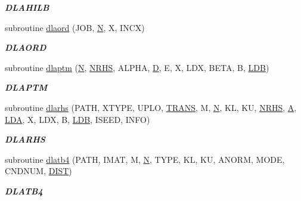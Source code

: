 \begin{DoxyCompactItemize}
\begin{DoxyCompactList}\small\item\em {\bfseries D\+L\+A\+H\+I\+L\+B} \end{DoxyCompactList}\item 
subroutine \hyperlink{group__double__lin_ga7352d554002db1120a207ed2ee03a787}{dlaord} (J\+O\+B, \hyperlink{polmisc_8c_a0240ac851181b84ac374872dc5434ee4}{N}, X, I\+N\+C\+X)
\begin{DoxyCompactList}\small\item\em {\bfseries D\+L\+A\+O\+R\+D} \end{DoxyCompactList}\item 
subroutine \hyperlink{group__double__lin_ga2531f677f628d30acf84634929d904e5}{dlaptm} (\hyperlink{polmisc_8c_a0240ac851181b84ac374872dc5434ee4}{N}, \hyperlink{example__user_8c_aa0138da002ce2a90360df2f521eb3198}{N\+R\+H\+S}, A\+L\+P\+H\+A, \hyperlink{odrpack_8h_a7dae6ea403d00f3687f24a874e67d139}{D}, E, X, L\+D\+X, B\+E\+T\+A, B, \hyperlink{example__user_8c_a50e90a7104df172b5a89a06c47fcca04}{L\+D\+B})
\begin{DoxyCompactList}\small\item\em {\bfseries D\+L\+A\+P\+T\+M} \end{DoxyCompactList}\item 
subroutine \hyperlink{group__double__lin_gada4fcd971471a815d7d0bba57fdf627b}{dlarhs} (P\+A\+T\+H, X\+T\+Y\+P\+E, U\+P\+L\+O, \hyperlink{superlu__enum__consts_8h_a0c4e17b2d5cea33f9991ccc6a6678d62a1f61e3015bfe0f0c2c3fda4c5a0cdf58}{T\+R\+A\+N\+S}, M, \hyperlink{polmisc_8c_a0240ac851181b84ac374872dc5434ee4}{N}, K\+L, K\+U, \hyperlink{example__user_8c_aa0138da002ce2a90360df2f521eb3198}{N\+R\+H\+S}, \hyperlink{classA}{A}, \hyperlink{example__user_8c_ae946da542ce0db94dced19b2ecefd1aa}{L\+D\+A}, X, L\+D\+X, B, \hyperlink{example__user_8c_a50e90a7104df172b5a89a06c47fcca04}{L\+D\+B}, I\+S\+E\+E\+D, I\+N\+F\+O)
\begin{DoxyCompactList}\small\item\em {\bfseries D\+L\+A\+R\+H\+S} \end{DoxyCompactList}\item 
subroutine \hyperlink{group__double__lin_gac09912983da8caf02d35f6a5ed360190}{dlatb4} (P\+A\+T\+H, I\+M\+A\+T, M, \hyperlink{polmisc_8c_a0240ac851181b84ac374872dc5434ee4}{N}, T\+Y\+P\+E, K\+L, K\+U, A\+N\+O\+R\+M, M\+O\+D\+E, C\+N\+D\+N\+U\+M, \hyperlink{superlu__enum__consts_8h_af00a42ecad444bbda75cde1b64bd7e72ac04fbbdf0d80a4ad25e565541deeebd7}{D\+I\+S\+T})
\begin{DoxyCompactList}\small\item\em {\bfseries D\+L\+A\+T\+B4} \end{DoxyCompactList}\item 

\end{DoxyCompactItemize}
